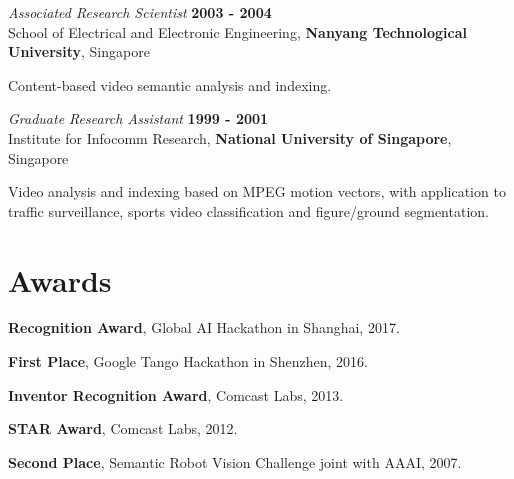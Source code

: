 \documentclass[margin,line]{resume}
\begin{document}
\begin{resume}
    \textsl{Associated Research Scientist} \hfill \textbf{2003 - 2004}\\
    School of Electrical and Electronic Engineering, \textbf{Nanyang Technological University}, Singapore
    \begin{list2}
        \item Content-based video semantic analysis and indexing.
    \end{list2}

    \textsl{Graduate Research Assistant} \hfill \textbf{1999 - 2001}\\
    Institute for Infocomm Research, \textbf{National University of Singapore}, Singapore
    \begin{list2}
        \item Video analysis and indexing based on MPEG motion vectors, with application to traffic surveillance, sports video classification and figure/ground segmentation.
    \end{list2}

   \section{\mysidestyle Awards}
	       \begin{list2}
		        \item  \textbf{Recognition Award}, Global AI Hackathon in Shanghai, 2017.
		        \item \textbf{First Place}, Google Tango Hackathon in Shenzhen, 2016.
		        \item \textbf{Inventor Recognition Award}, Comcast Labs, 2013.
		        \item  \textbf{STAR Award}, Comcast Labs, 2012.
		        \item  \textbf{Second Place}, Semantic Robot Vision Challenge joint with AAAI, 2007.	        
	        \end{list2}
       
        
        
       
    




\end{resume}
\end{document}
